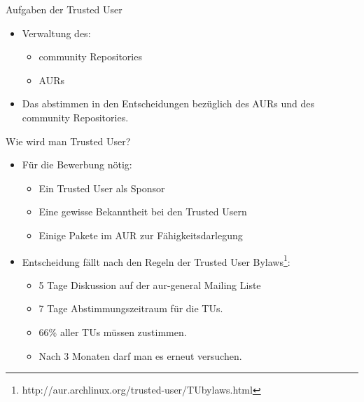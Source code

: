 
\begin{slide}{Aufgaben der Trusted User}
	\begin{itemize}
		\item{Verwaltung des:
			\begin{itemize}
				\item{community Repositories}
				\item{AURs}
			\end{itemize}
		}
		\item{Das abstimmen in den Entscheidungen bezüglich des AURs und des community Repositories.}
	\end{itemize}
\end{slide}

\begin{slide}{Wie wird man Trusted User?}
	\begin{itemize}
		\item{Für die Bewerbung nötig:
			\begin{itemize}
				\item{Ein Trusted User als Sponsor}
				\item{Eine gewisse Bekanntheit bei den Trusted Usern}
				\item{Einige Pakete im AUR zur Fähigkeitsdarlegung}
			\end{itemize}
		}
		\item{Entscheidung fällt nach den Regeln der Trusted User Bylaws\footnote{http://aur.archlinux.org/trusted-user/TUbylaws.html}:
			\begin{itemize}
				\item{5 Tage Diskussion auf der aur-general Mailing Liste}
				\item{7 Tage Abstimmungszeitraum für die TUs.}
				\item{66\% aller TUs müssen zustimmen.}
				\item{Nach 3 Monaten darf man es erneut versuchen.}
			\end{itemize}
		}
	\end{itemize}
\end{slide}

